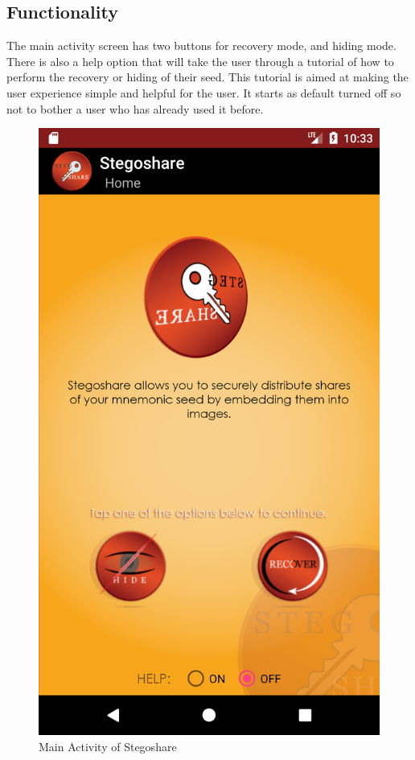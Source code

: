 \subsection{Functionality}
The main activity screen has two buttons for recovery mode, and hiding mode. There is also a help option that will take the user through a tutorial
of how to perform the recovery or hiding of their seed. This tutorial is aimed at making the user experience simple and helpful for the user. It starts
as default turned off so not to bother a user who has already used it before.

\begin{figure}[H]
	\centering
  \includegraphics[scale = 0.05]{main_activity.png}
	\caption{Main Activity of Stegoshare}
	\label{fig: Main activity}
\end{figure}

